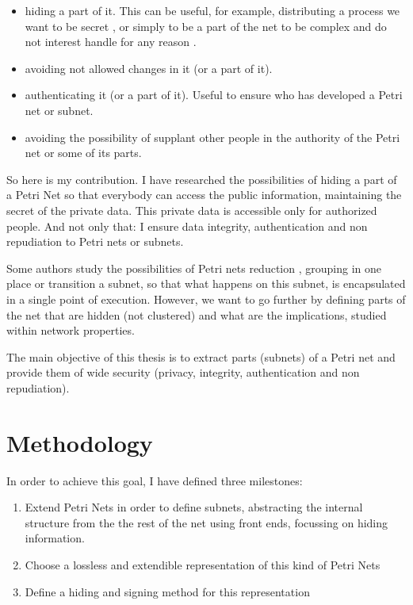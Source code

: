 \begin{itemize}
\item 
hiding a part of it. This can be useful, for example,
distributing a process we want to be secret \citep{HID-Inigo2011MT},
or simply to be a part of the net to be complex and do not
interest handle for any reason \citep{HID-Inigo2011MT}.

\item avoiding not allowed changes in it (or a part of it).
\item authenticating it (or a part of it). Useful to ensure who has developed
a Petri net or subnet.
\item avoiding the possibility of supplant other people in the authority of
the Petri net or some of its parts.

\end{itemize}
So here is my contribution. I have researched the possibilities of hiding
a part of a Petri Net so that everybody can access the public information,
maintaining the secret of the private data. This private data is accessible only
for authorized people. And not only that: I ensure data integrity, authentication
and non repudiation to Petri nets or subnets.

Some authors study the possibilities of Petri nets reduction \citep{SN-Valette197935,SN-Suzuki198351,SN-Fahmy1990321,SN-DRUZHININVA19921922,SN-Fahmy1993127,R-Xia20111662}, grouping
in one place or transition a subnet, so that what happens
on this subnet, is encapsulated in a single point of execution. However,
we want to go further by defining parts of the net that are hidden (not clustered) and what are the implications, studied within
network properties.

The main objective of this thesis is to extract parts (subnets) of a Petri net and provide
them of wide security (privacy, integrity, authentication and non repudiation).



\section{Methodology}


In order to achieve this goal, I have defined three milestones:

\begin{enumerate}
\item
Extend Petri Nets in order to define subnets, abstracting the
internal structure from the the rest of the net using front ends, focussing on hiding information. 
\item
Choose a lossless and extendible representation
of this kind of Petri Nets
\item
Define a hiding and signing method for this representation
\end{enumerate}



